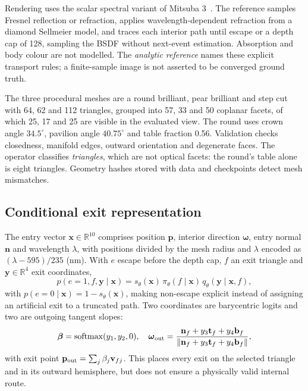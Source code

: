 \documentclass[conference]{IEEEtran}
\newcommand{\dg}{^{\circ}}
\newcommand{\R}{\mathbb{R}}
\begin{document}
Rendering uses the scalar spectral variant of Mitsuba 3~\cite{mitsuba3}. The
reference samples Fresnel reflection or refraction, applies wavelength-dependent
refraction from a diamond Sellmeier model, and traces each interior path until
escape or a depth cap of 128, sampling the BSDF without next-event estimation.
Absorption and body colour are not modelled. The \emph{analytic reference} names
these explicit transport rules; a finite-sample image is not asserted to be
converged ground truth.


The three procedural meshes are a round brilliant, pear brilliant and step cut
with 64, 62 and 112 triangles, grouped into 57, 33 and 50 coplanar facets, of
which 25, 17 and 25 are visible in the evaluated view. The round uses crown
angle $34.5\dg$, pavilion angle $40.75\dg$ and table fraction 0.56. Validation
checks closedness, manifold edges, outward orientation and degenerate faces.
The operator classifies \emph{triangles}, which are not optical facets: the
round's table alone is eight triangles. Geometry hashes stored with data and
checkpoints detect mesh mismatches.

\subsection{Conditional exit representation}
The entry vector $\mathbf{x}\in\R^{10}$ comprises position $\mathbf{p}$,
interior direction $\boldsymbol\omega$, entry normal $\mathbf{n}$ and wavelength
$\lambda$, with positions divided by the mesh radius and $\lambda$ encoded as
$(\lambda-595)/235$ (nm). With $e$ escape before the depth cap, $f$ an exit
triangle and $\mathbf{y}\in\R^4$ exit coordinates,
\begin{equation}
 p(e=1,f,\mathbf{y}\mid\mathbf{x})=
 s_\theta(\mathbf{x})\,\pi_\theta(f\mid\mathbf{x})\,
 q_\theta(\mathbf{y}\mid\mathbf{x},f),
\end{equation}
with $p(e=0\mid\mathbf{x})=1-s_\theta(\mathbf{x})$, making non-escape explicit
instead of assigning an artificial exit to a truncated path. Two coordinates
are barycentric logits and two are outgoing tangent slopes:
\begin{equation}
 \boldsymbol\beta=\operatorname{softmax}(y_1,y_2,0),\quad
 \boldsymbol\omega_{\rm out}=
 \frac{\mathbf{n}_f+y_3\mathbf{t}_f+y_4\mathbf{b}_f}
 {\|\mathbf{n}_f+y_3\mathbf{t}_f+y_4\mathbf{b}_f\|},
\end{equation}
with exit point $\mathbf{p}_{\rm out}=\sum_j\beta_j\mathbf{v}_{fj}$. This places
every exit on the selected triangle and in its outward hemisphere, but does not
ensure a physically valid internal route.
\end{document}
